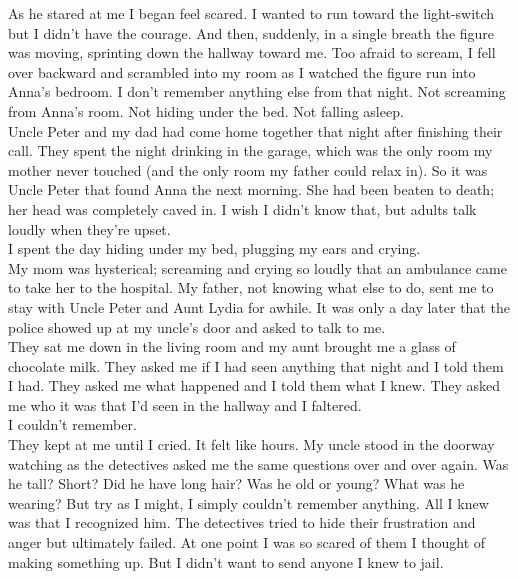 \documentclass[a5paper]{scrartcl}
\begin{document}
As he stared at me I began feel scared. I wanted to run toward the light-switch but I didn't have the courage. And then, suddenly, in a single breath the figure was moving, sprinting down the hallway toward me.  Too afraid to scream, I fell over backward and scrambled into my room as I watched the figure run into Anna's bedroom. I don't remember anything else from that night. Not screaming from Anna's room. Not hiding under the bed. Not falling asleep. \\


Uncle Peter and my dad had come home together that night after finishing their call. They spent the night drinking in the garage, which was the only room my mother never touched (and the only room my father could relax in). So it was Uncle Peter that found Anna the next morning. She had been beaten to death; her head was completely caved in. I wish I didn't know that, but adults talk loudly when they're upset. \\


I spent the day hiding under my bed, plugging my ears and crying.\\


My mom was hysterical; screaming and crying so loudly that an ambulance came to take her to the hospital. My father, not knowing what else to do, sent me to stay with Uncle Peter and Aunt Lydia for awhile. It was only a day later that the police showed up at my uncle's door and asked to talk to me.\\


They sat me down in the living room and my aunt brought me a glass of chocolate milk. They asked me if I had seen anything that night and I told them I had. They asked me what happened and I told them what I knew. They asked me who it was that I'd seen in the hallway and I faltered. \\


I couldn't remember.\\


They kept at me until I cried. It felt like hours. My uncle stood in the doorway watching as the detectives asked me the same questions over and over again. Was he tall? Short? Did he have long hair? Was he old or young? What was he wearing? But try as I might, I simply couldn't remember anything. All I knew was that I recognized him. The detectives tried to hide their frustration and anger but ultimately failed. At one point I was so scared of them I thought of making something up. But I didn't want to send anyone I knew to jail.\\
\end{document}
